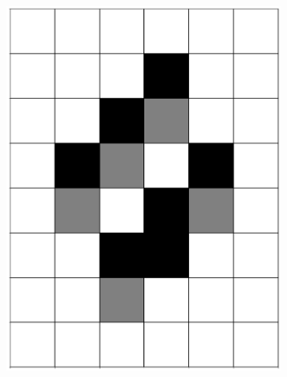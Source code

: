 \documentclass[12pt]{article}
\numberwithin{figure}{section} %
\begin{document}
\begin{figure}[H]
	\begin{subfigure}{0.16\textwidth}
     		\centering
     		\includegraphics[width=\linewidth]{Section4/21.0}
     		\subcaption{}
   	\end{subfigure}
     	\begin{subfigure}{0.16\textwidth}
     		\centering

\end{subfigure}
\end{figure}
\end{document}
